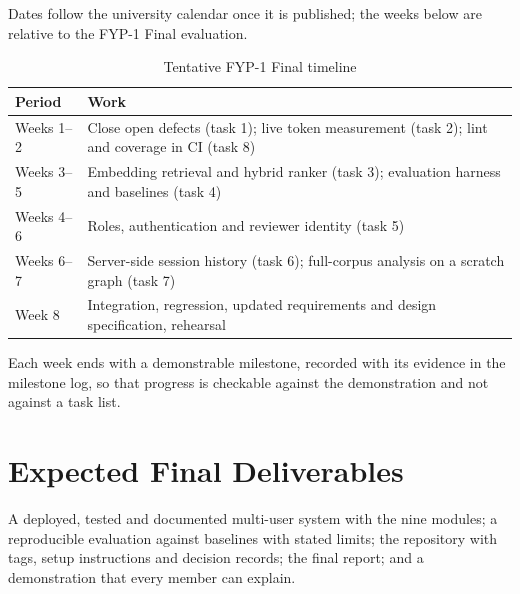 Dates follow the university calendar once it is published; the weeks below are relative to the FYP-1 Final evaluation.

\begin{table}[!htbp]
\centering
\caption{Tentative FYP-1 Final timeline}
\label{tab:timeline}
\small
\begin{tabularx}{\textwidth}{@{}>{\raggedright\arraybackslash}p{} L@{}}
\toprule
Period & Work \\
\midrule
Weeks 1--2 & Close open defects (task 1); live token measurement (task 2); lint and coverage in CI (task 8) \\
Weeks 3--5 & Embedding retrieval and hybrid ranker (task 3); evaluation harness and baselines (task 4) \\
Weeks 4--6 & Roles, authentication and reviewer identity (task 5) \\
Weeks 6--7 & Server-side session history (task 6); full-corpus analysis on a scratch graph (task 7) \\
Week 8 & Integration, regression, updated requirements and design specification, rehearsal \\
\bottomrule
\end{tabularx}
\end{table}

Each week ends with a demonstrable milestone, recorded with its evidence in the milestone log, so that progress is checkable against the demonstration and not against a task list.

\section{Expected Final Deliverables}

A deployed, tested and documented multi-user system with the nine modules; a reproducible evaluation against baselines with stated limits; the repository with tags, setup instructions and decision records; the final report; and a demonstration that every member can explain.
